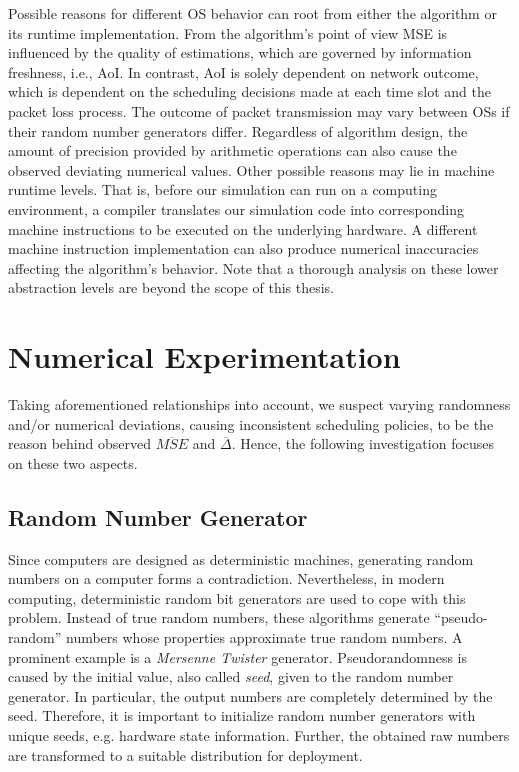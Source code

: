 Possible reasons for different OS behavior can root from either the algorithm or
its runtime implementation. From the algorithm's point of view MSE is influenced
by the quality of estimations, which are governed by information freshness,
i.e., AoI. In contrast, AoI is solely dependent on network outcome, which is
dependent on the scheduling decisions made at each time slot and the packet loss
process. The outcome of packet transmission may vary between OSs if their random
number generators differ. Regardless of algorithm design, the amount of
precision provided by arithmetic operations can also cause the observed
deviating numerical values. Other possible reasons may lie in machine runtime
levels. That is, before our simulation can run on a computing environment, a
compiler translates our simulation code into corresponding machine instructions
to be executed on the underlying hardware. A different machine instruction
implementation can also produce numerical inaccuracies affecting the algorithm's
behavior. Note that a thorough analysis on these lower abstraction levels are
beyond the scope of this thesis.


\section{Numerical Experimentation} \label{sec:experiments}

Taking aforementioned relationships into account, we suspect varying randomness
and/or numerical deviations, causing inconsistent scheduling policies, to be the
reason behind observed $\overline{MSE}$ and $\overline{\Delta}$. Hence, the
following investigation focuses on these two aspects.

\subsection{Random Number Generator}

Since computers are designed as deterministic machines, generating random
numbers on a computer forms a contradiction. Nevertheless, in modern computing,
deterministic random bit generators are used to cope with this problem. Instead
of true random numbers, these algorithms generate ``pseudo-random'' numbers
whose properties approximate true random numbers. A prominent example is a
\textit{Mersenne Twister} generator. Pseudorandomness is caused by the initial
value, also called \textit{seed}, given to the random number generator. In
particular, the output numbers are completely determined by the seed. Therefore,
it is important to initialize random number generators with unique seeds, e.g.
hardware state information. Further, the obtained raw numbers are transformed to
a suitable distribution for deployment.

